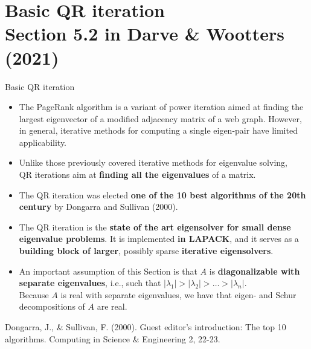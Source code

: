 \documentclass[t,usepdftitle=false]{beamer}
\begin{document}
\section{Basic QR iteration\\{\small Section 5.2 in Darve \& Wootters (2021)}}

\begin{frame}{Basic QR iteration}
\begin{itemize}
\item The PageRank algorithm is a variant of power iteration aimed at finding the largest eigenvector of a modified adjacency matrix of a web graph.\vspace{.05cm}
However, in general, iterative methods for computing a single eigen-pair have limited applicability.
\item Unlike those previously covered iterative methods for eigenvalue solving,\\
QR iterations aim at \textbf{finding all the eigenvalues} of a matrix.
\item The QR iteration was elected \textbf{one of the 10 best algorithms of the 20th century} by Dongarra and Sullivan (2000).
\item The QR iteration is the \textbf{state of the art eigensolver for small dense eigenvalue problems}.
It is implemented \textbf{in LAPACK}, and it serves as a \textbf{building block of larger}, possibly sparse \textbf{iterative eigensolvers}.
\item An important assumption of this Section is that $A$ is \textbf{diagonalizable with separate eigenvalues}, i.e., such that $|\lambda_1|>|\lambda_2|>\dots>|\lambda_n|$.\vspace{.1cm}\\
Because $A$ is real with separate eigenvalues, we have that eigen- and Schur decompositions of $A$ are real.
\end{itemize}
\tiny{Dongarra, J., \& Sullivan, F. (2000). Guest editor's introduction: The top 10 algorithms. Computing in Science \& Engineering 2, 22-23.}
\end{frame}
\end{document}
